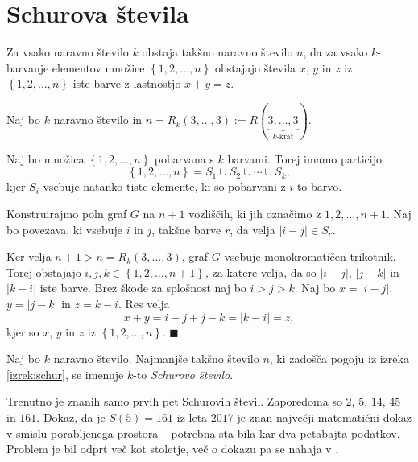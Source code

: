 \documentclass[twoside,11pt]{article}
\providecommand{\set}[1]{\left\{#1\right\}}
\providecommand{\abs}[1]{\left\lvert #1\right\rvert}
\begin{document}
\section{Schurova števila}

\begin{izrek}[Schur] \label{izrek:schur}
    Za vsako naravno število $k$ obstaja takšno naravno število $n$, da za vsako 
    $k$-barvanje elementov množice $\set{1, 2, \dots, n}$ obstajajo števila $x$, $y$ in $z$
    iz $\set{1, 2, \dots, n}$ iste barve z lastnostjo $x + y = z$.
\end{izrek}

\begin{dokaz}
    Naj bo $k$ naravno število in $n = R_k(3, \dots, 3) := R(\underbrace{3, \dots, 3}_{\text{$k$-krat}})$.
    
    Naj bo množica $\set{1, 2, \dots, n}$ pobarvana s $k$ barvami. 
    Torej imamo particijo
    \[
        \set{1, 2, \dots, n} = S_1 \cup S_2 \cup \dotsb \cup S_k,
    \]
    kjer $S_i$ vsebuje natanko tiste elemente, ki so pobarvani z $i$-to barvo.

    Konstruirajmo poln graf $G$ na $n+1$ vozliščih, ki jih označimo z
    $1, 2, \dots, n+1$. Naj bo povezava, ki vsebuje $i$ in $j$, takšne barve $r$,
    da velja $\abs{i-j} \in S_r$. 

    Ker velja $n+1 > n = R_k(3, \dots, 3)$, graf $G$ vsebuje monokromatičen 
    trikotnik. Torej obstajajo $i, j, k \in \set{1,2, \dots, n+1}$, za katere 
    velja, da so $\abs{i-j}$, $\abs{j-k}$ in $\abs{k-i}$ iste barve. Brez škode 
    za splošnost naj bo $i > j > k$. Naj bo $x = \abs{i - j}$, $y = \abs{j - k}$ in 
    $z = {k - i}$. Res velja
    \[
        x + y = i - j + j - k = \abs{k - i} = z,
    \]
    kjer so $x$, $y$ in $z$ iz $\set{1, 2, \dots, n}$. \hfill $\blacksquare$
\end{dokaz}

\begin{definicija}
    Naj bo $k$ naravno število. Najmanjše takšno število $n$, ki zadošča 
    pogoju iz izreka \ref{izrek:schur}, se imenuje 
    $k$-to \emph{Schurovo število}.
\end{definicija}

Trenutno je znanih samo prvih pet Schurovih števil. Zaporedoma so $2$, $5$,
$14$, $45$ in $161$. Dokaz, da je $S(5) = 161$ iz leta $2017$ je znan največji 
matematični dokaz v smislu porabljenega prostora -- potrebna sta bila 
kar dva petabajta podatkov. Problem je bil odprt več kot stoletje, več 
o dokazu pa se nahaja v \cite{schur}.
\end{document}
